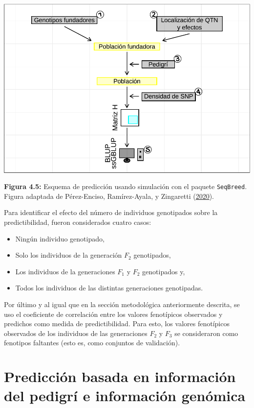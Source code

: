 \documentclass[11pt,spanish,a4paper,oneside,]{book} %
\begin{document}
\begin{center}\includegraphics[width=1\linewidth]{figures/Esquema_2} \end{center}

\noindent
\textbf{Figura 4.5:} Esquema de predicción usando simulación con el paquete \texttt{SeqBreed}. Figura adaptada de Pérez-Enciso, Ramírez-Ayala, y Zingaretti (\protect\hyperlink{ref-cite:47}{2020}).

Para identificar el efecto del número de individuos genotipados sobre la predictibilidad, fueron considerados cuatro casos:

\begin{itemize}
\item
  Ningún individuo genotipado,
\item
  Solo los individuos de la generación \(F_{2}\) genotipados,
\item
  Los individuos de la generaciones \(F_{1}\) y \(F_{2}\) genotipados y,
\item
  Todos los individuos de las distintas generaciones genotipadas.
\end{itemize}

Por último y al igual que en la sección metodológica anteriormente descrita, se uso el coeficiente de correlación entre los valores fenotípicos observados y predichos como medida de predictibilidad. Para esto, los valores fenotípicos observados de los individuos de las generaciones \(F_{2}\) y \(F_{3}\) se consideraron como fenotipos faltantes (esto es, como conjuntos de validación).

\hypertarget{predicciuxf3n-basada-en-informaciuxf3n-del-pedigruxed-e-informaciuxf3n-genuxf3mica}{%
\section{Predicción basada en información del pedigrí e información genómica}\label{predicciuxf3n-basada-en-informaciuxf3n-del-pedigruxed-e-informaciuxf3n-genuxf3mica}}
\end{document}
